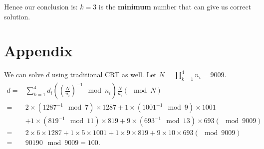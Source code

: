\documentclass[12pt]{article}
\theoremstyle{plain}
\begin{document}
Hence our conclusion is: $k=3$ is the {\bf minimum} number that can give us correct solution.

\section{Appendix}
We can solve $d$ using traditional CRT as well. 
Let $N = \prod_{k=1}^4 n_i = 9009$.
$$\begin{aligned}
d =& \sum_{k=1}^4 d_i \left(\left(\frac{N}{n_i}\right)^{-1} \mod n_i \right) \frac{N}{n_i}  (\mod N)\\
=& 2\times(1287^{-1} \mod 7)\times 1287 + 1\times(1001^{-1} \mod 9)\times 1001 \\
&+ 1\times(819^{-1} \mod 11)\times 819 + 9\times(693^{-1} \mod 13)\times 693 (\mod 9009)\\
=& 2\times 6\times 1287 + 1\times 5\times 1001 + 1\times 9\times 819 + 9\times 10\times 693 (\mod 9009)\\
=& 90190 \mod 9009 = 100.
\end{aligned}$$
\end{document}
